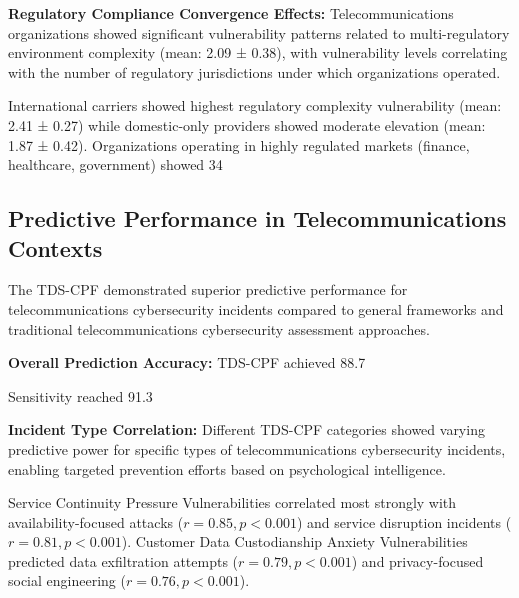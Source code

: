 \documentclass[10pt, twocolumn]{article}
\begin{document}
\textbf{Regulatory Compliance Convergence Effects:} Telecommunications organizations showed significant vulnerability patterns related to multi-regulatory environment complexity (mean: 2.09 ± 0.38), with vulnerability levels correlating with the number of regulatory jurisdictions under which organizations operated.

International carriers showed highest regulatory complexity vulnerability (mean: 2.41 ± 0.27) while domestic-only providers showed moderate elevation (mean: 1.87 ± 0.42). Organizations operating in highly regulated markets (finance, healthcare, government) showed 34%

\subsection{Predictive Performance in Telecommunications Contexts}

The TDS-CPF demonstrated superior predictive performance for telecommunications cybersecurity incidents compared to general frameworks and traditional telecommunications cybersecurity assessment approaches.

\textbf{Overall Prediction Accuracy:} TDS-CPF achieved 88.7%

Sensitivity reached 91.3%

\textbf{Incident Type Correlation:} Different TDS-CPF categories showed varying predictive power for specific types of telecommunications cybersecurity incidents, enabling targeted prevention efforts based on psychological intelligence.

Service Continuity Pressure Vulnerabilities correlated most strongly with availability-focused attacks ($r = 0.85, p < 0.001$) and service disruption incidents ($r = 0.81, p < 0.001$). Customer Data Custodianship Anxiety Vulnerabilities predicted data exfiltration attempts ($r = 0.79, p < 0.001$) and privacy-focused social engineering ($r = 0.76, p < 0.001$).
\end{document}
